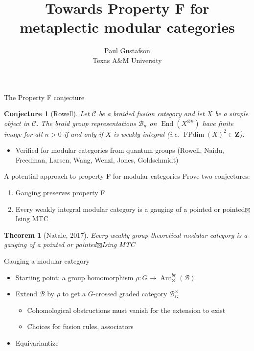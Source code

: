 \documentclass{beamer}
\title{Towards Property F for metaplectic modular categories}
\date{Paul Gustafson \\ Texas A\&M University}
\newcommand{\mB}{\mathcal{B}}
\newtheorem{thm}[theorem]{Theorem}
\newtheorem{conj}[theorem]{Conjecture}
\DeclareMathOperator{\FPdim}{FPdim}
\DeclareMathOperator{\Aut}{Aut}
\DeclareMathOperator{\End}{End}
\begin{document}
\frame{\titlepage}


\begin{frame}{The Property F conjecture}
\begin{conj}[Rowell]
Let $\mathcal C$ be a braided fusion category and let $X$ be a simple object in $\mathcal C$.  The braid group representations $\mathcal B_n$ on $\End(X^{\otimes n})$ have finite image for all $n>0$ if and only if  $X$ is weakly integral (i.e. $\FPdim(X)^2 \in \mathbf Z$).
\end{conj}

\begin{itemize}
\item Verified for modular categories from quantum groups (Rowell, Naidu, Freedman, Larsen, Wang, Wenzl, Jones, Goldschmidt) 
\end{itemize}
\end{frame}


\begin{frame}{A potential approach to property F for modular categories}
  Prove two conjectures:
  \begin{enumerate}[(1)]
  \item Gauging preserves property F
  \item Every weakly integral modular category is a gauging of a pointed or pointed$\boxtimes$Ising MTC
  \end{enumerate}

  \pause

  \begin{thm}[Natale, 2017]
    Every weakly group-theoretical modular category is a gauging of a pointed or pointed$\boxtimes$Ising MTC
  \end{thm}
\end{frame}


\begin{frame}{Gauging a modular category}
  \begin{itemize}
  \item Starting point: a group homomorphism $\rho: G \to \Aut_\otimes^{br}(\mB)$
  \item Extend $\mB$ by $\rho$ to get a $G$-crossed graded category $\mB_G^\times$
    \begin{itemize}
    \item Cohomological obstructions must vanish for the extension to exist
    \item Choices for fusion rules, associators 
    \end{itemize}
  \item Equivariantize 
  \end{itemize}
\end{frame}
\end{document}

